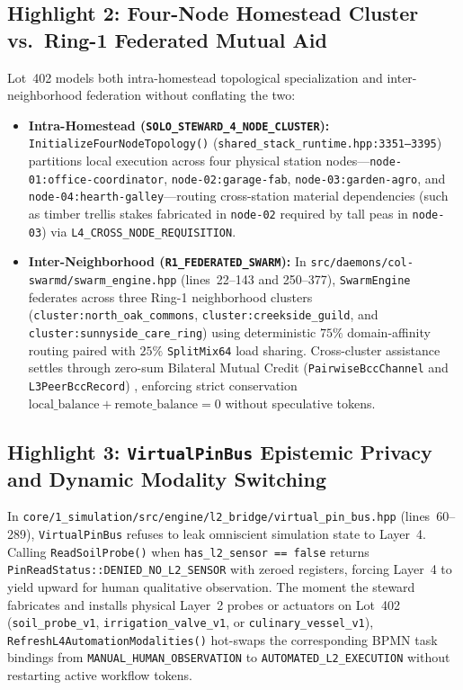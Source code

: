 \subsection{Highlight 2: Four-Node Homestead Cluster vs.\ Ring-1 Federated Mutual Aid}

Lot~402 models both intra-homestead topological specialization and inter-neighborhood federation without conflating the two:
\begin{itemize}
  \item \textbf{Intra-Homestead (\texttt{SOLO\_STEWARD\_4\_NODE\_CLUSTER}):} \texttt{InitializeFourNodeTopology()} (\texttt{shared\_stack\_runtime.hpp:3351--3395}) partitions local execution across four physical station nodes---\texttt{node-01:office-coordinator}, \texttt{node-02:garage-fab}, \texttt{node-03:garden-agro}, and \texttt{node-04:hearth-galley}---routing cross-station material dependencies (such as timber trellis stakes fabricated in \texttt{node-02} required by tall peas in \texttt{node-03}) via \texttt{L4\_CROSS\_NODE\_REQUISITION}.
  \item \textbf{Inter-Neighborhood (\texttt{R1\_FEDERATED\_SWARM}):} In \texttt{src/daemons/col-swarmd/swarm\_engine.hpp} (lines~22--143 and 250--377), \texttt{SwarmEngine} federates across three Ring-1 neighborhood clusters (\texttt{cluster:north\_oak\_commons}, \texttt{cluster:creekside\_guild}, and \texttt{cluster:sunnyside\_care\_ring}) using deterministic $75\%$ domain-affinity routing paired with $25\%$ \texttt{SplitMix64} load sharing. Cross-cluster assistance settles through zero-sum Bilateral Mutual Credit (\texttt{PairwiseBccChannel} and \texttt{L3PeerBccRecord}) \parencite{grigg2004,ostrom1990}, enforcing strict conservation $\text{local\_balance} + \text{remote\_balance} = 0$ without speculative tokens.
\end{itemize}

\subsection{Highlight 3: \texttt{VirtualPinBus} Epistemic Privacy and Dynamic Modality Switching}

In \texttt{core/1\_simulation/src/engine/l2\_bridge/virtual\_pin\_bus.hpp} (lines~60--289), \texttt{VirtualPinBus} refuses to leak omniscient simulation state to Layer~4. Calling \texttt{ReadSoilProbe()} when \texttt{has\_l2\_sensor == false} returns \texttt{PinReadStatus::DENIED\_NO\_L2\_SENSOR} with zeroed registers, forcing Layer~4 to yield upward for human qualitative observation. The moment the steward fabricates and installs physical Layer~2 probes or actuators on Lot~402 (\texttt{soil\_probe\_v1}, \texttt{irrigation\_valve\_v1}, or \texttt{culinary\_vessel\_v1}), \texttt{RefreshL4AutomationModalities()} hot-swaps the corresponding BPMN task bindings from \texttt{MANUAL\_HUMAN\_OBSERVATION} to \texttt{AUTOMATED\_L2\_EXECUTION} without restarting active workflow tokens.

